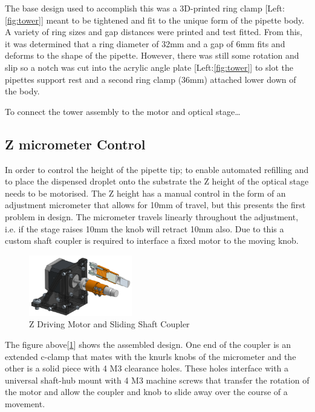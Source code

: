 The base design used to accomplish this was a 3D-printed ring clamp [Left:\ref{fig:tower}] meant to be tightened and fit to the unique form of the pipette body. A variety of ring sizes and gap distances were printed and test fitted. From this, it was determined that a ring diameter of 32mm and a gap of 6mm fits and deforms to the shape of the pipette. However, there was still some rotation and slip so a notch was cut into the acrylic angle plate [Left:\ref{fig:tower}] to slot the pipettes support rest and a second ring clamp (36mm) attached lower down of the body.

To connect the tower assembly to the motor and optical stage\dots

\subsection{Z micrometer Control}

In order to control the height of the pipette tip; to enable automated refilling and to place the dispensed droplet onto the substrate the Z height of the optical stage needs to be motorised. The Z height has a manual control in the form of an adjustment micrometer that allows for 10mm of travel, but this presents the first problem in design.
The micrometer travels linearly throughout the adjustment, i.e. if the stage raises 10mm the knob will retract 10mm also. Due to this a custom shaft coupler is required to interface a fixed motor to the moving knob.

\begin{figure}[h]
    \centering
    \includegraphics[width=0.4\textwidth]{img/z_control.png}
    \caption{Z Driving Motor and Sliding Shaft Coupler}
    \label{fig:z_coup}
\end{figure}

The figure above[\ref{fig:z_coup}] shows the assembled design. One end of the coupler is an extended c-clamp that mates with the knurls knobs of the micrometer and the other is a solid piece with 4 M3 clearance holes. These holes interface with a universal shaft-hub mount with 4 M3 machine screws that transfer the rotation of the motor and allow the coupler and knob to slide away over the course of a movement.


